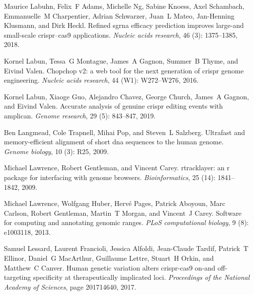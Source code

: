 \documentclass[pdftex,english,10pt]{article}
\begin{document}
{\begin{thebibliography}{105}
Maurice Labuhn, Felix~F Adams, Michelle Ng, Sabine Knoess, Axel Schambach,
  Emmanuelle~M Charpentier, Adrian Schwarzer, Juan~L Mateo, Jan-Henning
  Klusmann, and Dirk Heckl.
\newblock Refined sgrna efficacy prediction improves large-and small-scale
  crispr--cas9 applications.
\newblock \emph{Nucleic acids research}, 46 (3): 1375--1385,
  2018.

Kornel Labun, Tessa~G Montague, James~A Gagnon, Summer~B Thyme, and Eivind
  Valen.
\newblock Chopchop v2: a web tool for the next generation of crispr genome
  engineering.
\newblock \emph{Nucleic acids research}, 44 (W1): W272--W276,
  2016.

Kornel Labun, Xiaoge Guo, Alejandro Chavez, George Church, James~A Gagnon, and
  Eivind Valen.
\newblock Accurate analysis of genuine crispr editing events with amplican.
\newblock \emph{Genome research}, 29 (5): 843--847, 2019.

Ben Langmead, Cole Trapnell, Mihai Pop, and Steven~L Salzberg.
\newblock Ultrafast and memory-efficient alignment of short dna sequences to
  the human genome.
\newblock \emph{Genome biology}, 10 (3): R25, 2009.

Michael Lawrence, Robert Gentleman, and Vincent Carey.
\newblock rtracklayer: an r package for interfacing with genome browsers.
\newblock \emph{Bioinformatics}, 25 (14): 1841--1842, 2009.

Michael Lawrence, Wolfgang Huber, Herv{\'e} Pages, Patrick Aboyoun, Marc
  Carlson, Robert Gentleman, Martin~T Morgan, and Vincent~J Carey.
\newblock Software for computing and annotating genomic ranges.
\newblock \emph{PLoS computational biology}, 9 (8): e1003118,
  2013.

Samuel Lessard, Laurent Francioli, Jessica Alfoldi, Jean-Claude Tardif,
  Patrick~T Ellinor, Daniel~G MacArthur, Guillaume Lettre, Stuart~H Orkin, and
  Matthew~C Canver.
\newblock Human genetic variation alters crispr-cas9 on-and off-targeting
  specificity at therapeutically implicated loci.
\newblock \emph{Proceedings of the National Academy of Sciences}, page
  201714640, 2017.


\end{thebibliography}}
\end{document}

